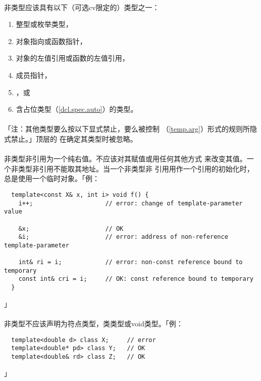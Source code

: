\paragraph{}
非类型应该具有以下（可选cv限定的）类型之一：
\begin{enumerate}
  \item{整型或枚举类型，}
  \item{对象指向或函数指针，}
  \item{对象的左值引用或函数的左值引用，}
  \item{成员指针，}
  \item{，或}
  \item{含占位类型（\ref{dcl.spec.auto}）的类型。}
\end{enumerate}

\paragraph{}
「注：其他类型要么按以下显式禁止，要么被控制
（\ref{temp.arg}）形式的规则所隐式禁止。」顶层的
在确定其类型时被忽略。

\paragraph{}
非类型非引用为一个纯右值。不应该对其赋值或用任何其他方式
来改变其值。一个非类型非引用不能取其地址。当一个非类型非
引用用作一个引用的初始化时，总是使用一个临时对象。「例：
\begin{lstlisting}
  template<const X& x, int i> void f() {
    i++;                    // error: change of template-parameter value

    &x;                     // OK
    &i;                     // error: address of non-reference template-parameter

    int& ri = i;            // error: non-const reference bound to temporary
    const int& cri = i;     // OK: const reference bound to temporary
  }
\end{lstlisting}」

\paragraph{}
非类型不应该声明为符点类型，类类型或void类型。「例：
\begin{lstlisting}
  template<double d> class X;     // error
  template<double* pd> class Y;   // OK
  template<double& rd> class Z;   // OK
\end{lstlisting}」

